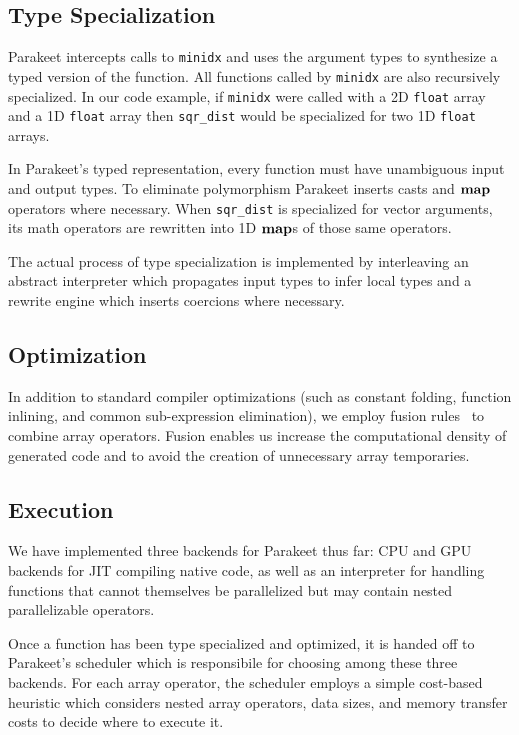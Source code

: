 \documentclass[10pt,twocolumn]{article}
\begin{document}
\subsection{Type Specialization}
Parakeet intercepts calls to \lstinline{minidx} and uses the argument types to synthesize a typed version of the function. All functions called by \lstinline{minidx} are also recursively specialized. In our code example, if \lstinline{minidx} were called with a 2D \lstinline{float} array and a 1D \lstinline{float} array then \lstinline{sqr_dist} would be specialized for two 1D \lstinline{float} arrays.

In Parakeet's typed representation, every function must have unambiguous input and output types. To eliminate polymorphism Parakeet inserts casts and $\mbox{\textbf{map}}$ operators where necessary. When \lstinline{sqr_dist} is specialized for vector arguments, its math operators are rewritten into 1D $\mbox{\textbf{map}}$s of those same operators.

The actual process of type specialization is implemented by interleaving an abstract interpreter which propagates input types to infer local types and a rewrite engine which inserts coercions where necessary.

\subsection{Optimization}
In addition to standard compiler optimizations (such as constant folding, function inlining, and common sub-expression elimination), we employ fusion rules~\cite{Jones01} to combine array operators. Fusion enables us increase the computational density of generated code and to avoid the creation of unnecessary array temporaries.

\subsection{Execution}
We have implemented three backends for Parakeet thus far: CPU and GPU backends for JIT compiling native code, as well as an interpreter for handling functions that cannot themselves be parallelized but may contain nested parallelizable operators.

Once a function has been type specialized and optimized, it is handed off to Parakeet's scheduler which is responsibile for choosing among these three backends.  For each array operator, the scheduler employs a simple cost-based heuristic which considers nested array operators, data sizes, and memory transfer costs to decide where to execute it.
\end{document}
